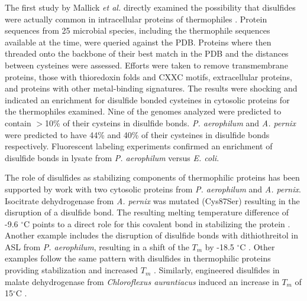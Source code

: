 {The first study by Mallick \emph{et al.} directly examined the possibility that
disulfides were actually common in intracellular proteins of thermophiles
\cite{mallick2002gei}.  Protein sequences from 25 microbial species, including
the thermophile sequences available at the time, were queried against the PDB.
Proteins where then threaded onto the backbone of their best match in the PDB
and the distances between cysteines were assessed.  Efforts were taken to
remove transmembrane proteins, those with thioredoxin folds and CXXC motifs,
extracellular proteins, and proteins with other metal-binding signatures.  The
results were shocking and indicated an enrichment for disulfide bonded
cysteines in cytosolic proteins for the thermophiles examined.  Nine of the
genomes analyzed were predicted to contain $>$10\% of their cysteins in
disulfide bonds.  \emph{P. aerophilum} and \emph{A.  pernix} were predicted to
have 44\% and 40\% of their cysteines in disulfide bonds respectively.
Fluorescent labeling experiments confirmed an enrichment of disulfide bonds in
lysate from \emph{P.  aerophilum} versus \emph{E. coli}.


The role of disulfides as stabilizing components of thermophilic proteins has
been supported by work with two cytosolic proteins from \emph{P. aerophilum}
and \emph{A. pernix}.  Isocitrate dehydrogenase from \emph{A. pernix} was
mutated (Cys87Ser) resulting in the disruption of a disulfide bond.  The
resulting melting temperature difference of -9.6 $^\circ$C points to a direct
role for this covalent bond in stabilizing the protein \cite{karlstrom2005idh}.
Another example includes the disruption of disulfide bonds with dithiothreitol
in ASL from \emph{P.  aerophilum}, resulting in a shift of the ${T }_{m }$ by
-18.5 $^\circ$C \cite{toth2000sal}.  Other examples follow the same pattern
with disulfides in thermophilic proteins providing stabilization and increased
${T }_{m }$ \cite{ladenstein2006pda}.  Similarly, engineered disulfides in
malate dehydrogenase from \emph{Chloroflexus aurantiacus} induced an increase
in ${T }_{m }$ of 15$^\circ$C \cite{bjork2004lit}.

}
